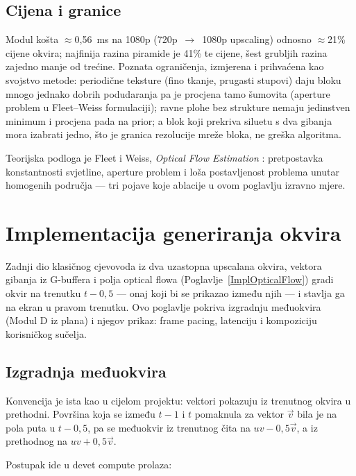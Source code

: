 \documentclass{mathos}
\begin{document}
\section{Cijena i granice}

Modul košta $\approx$0,56~ms na 1080p (720p~$\to$~1080p upscaling) odnosno
$\approx$21\% cijene okvira; najfinija razina piramide je 41\% te cijene, šest
grubljih razina zajedno manje od trećine. Poznata ograničenja, izmjerena i
prihvaćena kao svojstvo metode: periodične teksture (fino tkanje, prugasti
stupovi) daju bloku mnogo jednako dobrih podudaranja pa je procjena tamo
šumovita (aperture problem u Fleet--Weiss formulaciji); ravne plohe bez
strukture nemaju jedinstven minimum i procjena pada na prior; a blok koji
prekriva siluetu s dva gibanja mora izabrati jedno, što je granica rezolucije
mreže bloka, ne greška algoritma.

Teorijska podloga je Fleet i Weiss, \emph{Optical Flow Estimation}
\cite{FleetWeiss}: pretpostavka konstantnosti svjetline, aperture problem i
loša postavljenost problema unutar homogenih područja — tri pojave koje
ablacije u ovom poglavlju izravno mjere.


\chapter{Implementacija generiranja okvira}\label{ImplFrameGen}

Zadnji dio klasičnog cjevovoda iz dva uzastopna upscalana okvira, vektora
gibanja iz G-buffera i polja optical flowa (Poglavlje~\ref{ImplOpticalFlow})
gradi okvir na trenutku $t-0,5$ — onaj koji bi se prikazao između njih — i
stavlja ga na ekran u pravom trenutku. Ovo poglavlje pokriva izgradnju
međuokvira (Modul D iz plana) i njegov prikaz: frame pacing, latenciju i
kompoziciju korisničkog sučelja.

\section{Izgradnja međuokvira}

Konvencija je ista kao u cijelom projektu: vektori pokazuju iz trenutnog
okvira u prethodni. Površina koja se između $t-1$ i $t$ pomaknula za vektor
$\vec{v}$ bila je na pola puta u $t-0,5$, pa se međuokvir iz trenutnog čita
na $uv - 0,5\vec{v}$, a iz prethodnog na $uv + 0,5\vec{v}$.

Postupak ide u devet compute prolaza:
\end{document}
